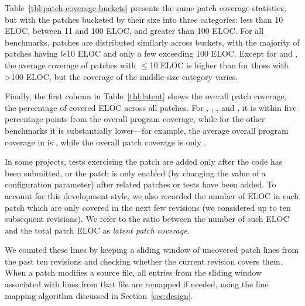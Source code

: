 Table~\ref{tbl:patch-coverage-buckets} presents the same patch
coverage statistics, but with the patches bucketed by their size into
three categories: less than 10 ELOC, between 11 and 100 ELOC, and
greater than 100 ELOC.  For all benchmarks, patches are distributed
similarly across buckets, with the majority of patches having $le$10
ELOC and only a few exceeding 100 ELOC. Except for \beanstalkd and \vim, the
average coverage of patches with $\le$10 ELOC is higher than for those with
\textgreater100 ELOC, but the coverage of the middle-size category varies.

Finally, the first column in Table~\ref{tbl:latent} shows the overall
patch coverage, \ie the percentage of covered ELOC across all patches.  For
\beanstalkd, \binutils, \git, \memcached and \vim, it is within five percentage
points from the overall program coverage, while for the other benchmarks it is
substantially lower---for example, the average overall program coverage in
\redis is \redisCoverageAverage, while the overall patch coverage is only
\redisOverallPatchCoverage.




In some projects, tests exercising the patch are added only after the
code has been submitted, or the patch is only enabled (\eg by changing
the value of a configuration parameter) after related patches or tests
have been added.  To account for this development style, we also
recorded the number of ELOC in each patch which are only covered in
the next few revisions (we considered up to ten subsequent revisions).
We refer to the ratio between the number of such ELOC and the total
patch ELOC as \textit{latent patch coverage}.

We counted these lines by keeping a sliding window of uncovered
patch lines from the past ten revisions and checking whether the
current revision covers them.  When a patch modifies a
source file, all entries from the sliding window associated with lines
from that file are remapped if needed, using the line mapping algorithm
discussed in Section~\ref{sec:design}.

